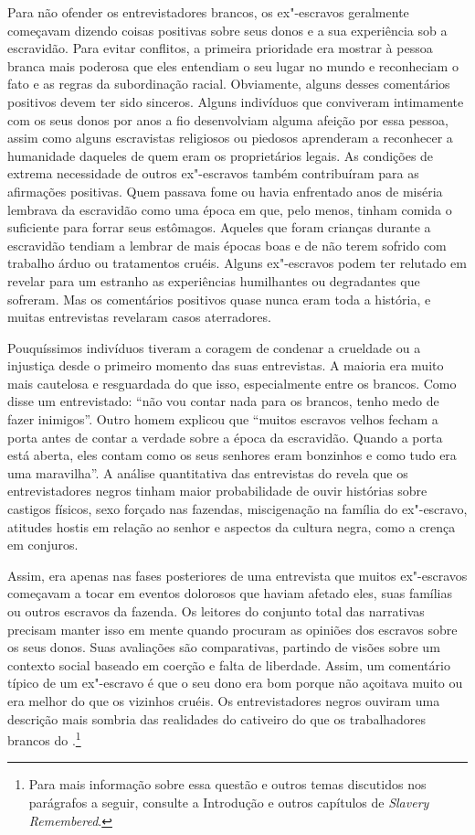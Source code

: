 Para não ofender os entrevistadores brancos, os ex"-escravos geralmente
começavam dizendo coisas positivas sobre seus donos e a sua experiência
sob a escravidão. Para evitar conflitos, a primeira prioridade era
mostrar à pessoa branca mais poderosa que eles entendiam o seu lugar no
mundo e reconheciam o fato e as regras da subordinação racial.
Obviamente, alguns desses comentários positivos devem ter sido sinceros.
Alguns indivíduos que conviveram intimamente com os seus donos por anos
a fio desenvolviam alguma afeição por essa pessoa, assim como alguns
escravistas religiosos ou piedosos aprenderam a reconhecer a humanidade
daqueles de quem eram os proprietários legais. As condições de extrema
necessidade de outros ex"-escravos também contribuíram para as afirmações
positivas. Quem passava fome ou havia enfrentado anos de miséria
lembrava da escravidão como uma época em que, pelo menos, tinham comida
o suficiente para forrar seus estômagos. Aqueles que foram crianças
durante a escravidão tendiam a lembrar de mais épocas boas e de não
terem sofrido com trabalho árduo ou tratamentos cruéis. Alguns
ex"-escravos podem ter relutado em revelar para um estranho as
experiências humilhantes ou degradantes que sofreram. Mas os comentários
positivos quase nunca eram toda a história, e muitas entrevistas
revelaram casos aterradores.

Pouquíssimos indivíduos tiveram a coragem de condenar a crueldade ou a
injustiça desde o primeiro momento das suas entrevistas. A maioria era
muito mais cautelosa e resguardada do que isso, especialmente entre os
brancos. Como disse um entrevistado: ``não vou contar nada para os
brancos, tenho medo de fazer inimigos''. Outro homem explicou que
``muitos escravos velhos fecham a porta antes de contar a verdade sobre
a época da escravidão. Quando a porta está aberta, eles contam como os
seus senhores eram bonzinhos e como tudo era uma maravilha''. A análise
quantitativa das entrevistas do  revela que os entrevistadores negros
tinham maior probabilidade de ouvir histórias sobre castigos físicos,
sexo forçado nas fazendas, miscigenação na família do ex"-escravo,
atitudes hostis em relação ao senhor e aspectos da cultura negra, como a
crença em conjuros.

Assim, era apenas nas fases posteriores de uma entrevista que muitos
ex"-escravos começavam a tocar em eventos dolorosos que haviam afetado
eles, suas famílias ou outros escravos da fazenda. Os leitores do
conjunto total das narrativas precisam manter isso em mente quando
procuram as opiniões dos escravos sobre os seus donos. Suas avaliações
são comparativas, partindo de visões sobre um contexto social baseado em
coerção e falta de liberdade. Assim, um comentário típico de um
ex"-escravo é que o seu dono era bom porque não açoitava muito ou era
melhor do que os vizinhos cruéis. Os entrevistadores negros ouviram uma
descrição mais sombria das realidades do cativeiro do que os
trabalhadores brancos do .\footnote{Para mais informação sobre essa
  questão e outros temas discutidos nos parágrafos a seguir, consulte a
  Introdução e outros capítulos de \emph{Slavery Remembered}.}


